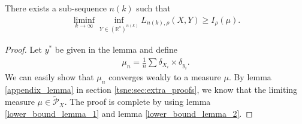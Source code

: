 \begin{proposition} \label{lower_bound_prop}
    There exists a sub-sequence $n(k)$ such that
    \begin{align}
        \liminf_{k \to \infty} \inf_{Y \in (\mathbb{R}^s)^{n(k)}} L_{n(k),\rho}(X,Y) \geq I_{\rho}(\mu).
    \end{align}
\end{proposition}
\begin{proof}
    Let $y^*$ be given in the lemma and define
    \begin{align}
        \mu_n = \frac{1}{n} \sum \delta_{X_i} \times \delta_{y_i}.
    \end{align}
    We can easily show that $\mu_n$ converges weakly to a measure $\mu$. By lemma \ref{appendix_lemma} in section \ref{tsne:sec:extra_proofs}, we know that the limiting measure $\mu \in \tilde{\mathcal{P}}_X$. The proof is complete by using lemma \ref{lower_bound_lemma_1} and lemma \ref{lower_bound_lemma_2}.
\end{proof}
